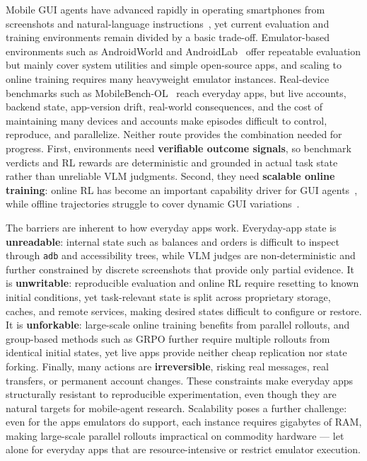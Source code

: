 \documentclass{llmxive}
\begin{document}
Mobile GUI agents have advanced rapidly in operating smartphones from screenshots and natural-language instructions~\cite{UITARS,AutoGLM,UIVenus15,GUIOw15,UIGenie}, yet current evaluation and training environments remain divided by a basic trade-off. Emulator-based environments such as AndroidWorld and AndroidLab~\cite{AndroidWorld,AndroidLab} offer repeatable evaluation but mainly cover system utilities and simple open-source apps, and scaling to online training requires many heavyweight emulator instances. Real-device benchmarks such as MobileBench-OL~\cite{MobileBenchOL} reach everyday apps, but live accounts, backend state, app-version drift, real-world consequences, and the cost of maintaining many devices and accounts make episodes difficult to control, reproduce, and parallelize. Neither route provides the combination needed for progress. First, environments need \textbf{verifiable outcome signals}, so benchmark verdicts and RL rewards are deterministic and grounded in actual task state rather than unreliable VLM judgments. Second, they need \textbf{scalable online training}: online RL has become an important capability driver for GUI agents~\cite{UIVenus15,UITARS2,AgentCPMGUI}, while offline trajectories struggle to cover dynamic GUI variations~\cite{MAIUI}.

The barriers are inherent to how everyday apps work. Everyday-app state is \textbf{unreadable}: internal state such as balances and orders is difficult to inspect through \texttt{adb} and accessibility trees, while VLM judges are non-deterministic and further constrained by discrete screenshots that provide only partial evidence. It is \textbf{unwritable}: reproducible evaluation and online RL require resetting to known initial conditions, yet task-relevant state is split across proprietary storage, caches, and remote services, making desired states difficult to configure or restore. It is \textbf{unforkable}: large-scale online training benefits from parallel rollouts, and group-based methods such as GRPO further require multiple rollouts from identical initial states, yet live apps provide neither cheap replication nor state forking. Finally, many actions are \textbf{irreversible}, risking real messages, real transfers, or permanent account changes. These constraints make everyday apps structurally resistant to reproducible experimentation, even though they are natural targets for mobile-agent research. Scalability poses a further challenge: even for the apps emulators do support, each instance requires gigabytes of RAM, making large-scale parallel rollouts impractical on commodity hardware --- let alone for everyday apps that are resource-intensive or restrict emulator execution.
\end{document}
